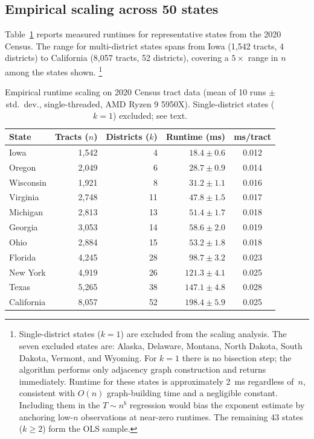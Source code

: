 \subsection{Empirical scaling across 50 states}

Table~\ref{tab:runtime} reports measured runtimes for representative states
from the 2020 Census.  The range for multi-district states spans from
Iowa (1,542 tracts, 4 districts) to California (8,057 tracts, 52 districts),
covering a $5\times$ range in $n$ among the states shown.%
\footnote{Single-district states ($k = 1$) are excluded
from the scaling analysis.  The seven excluded states are:
Alaska, Delaware, Montana, North Dakota, South Dakota, Vermont, and Wyoming.
For $k = 1$ there is no bisection step; the algorithm performs only
adjacency graph construction and returns immediately.
Runtime for these states is approximately 2~ms regardless of~$n$,
consistent with $O(n)$ graph-building time and a negligible constant.
Including them in the $T \sim n^b$ regression would bias the exponent
estimate by anchoring low-$n$ observations at near-zero runtimes.
The remaining 43 states ($k \geq 2$) form the OLS sample.}

\begin{table}[htb]
\centering
\caption{Empirical runtime scaling on 2020 Census tract data
  (mean of 10 runs $\pm$ std.\ dev., single-threaded, AMD Ryzen 9 5950X).
  Single-district states ($k = 1$) excluded; see text.}
\label{tab:runtime}
\begin{tabular}{lrrrc}
\toprule
State & Tracts ($n$) & Districts ($k$) & Runtime (ms) & ms/tract \\
\midrule
Iowa       & 1,542 &  4 & $18.4 \pm 0.6$ & 0.012 \\
Oregon     & 2,049 &  6 & $28.7 \pm 0.9$ & 0.014 \\
Wisconsin  & 1,921 &  8 & $31.2 \pm 1.1$ & 0.016 \\
Virginia   & 2,748 & 11 & $47.8 \pm 1.5$ & 0.017 \\
Michigan   & 2,813 & 13 & $51.4 \pm 1.7$ & 0.018 \\
Georgia    & 3,053 & 14 & $58.6 \pm 2.0$ & 0.019 \\
Ohio       & 2,884 & 15 & $53.2 \pm 1.8$ & 0.018 \\
Florida    & 4,245 & 28 & $98.7 \pm 3.2$ & 0.023 \\
New York   & 4,919 & 26 & $121.3 \pm 4.1$ & 0.025 \\
Texas      & 5,265 & 38 & $147.1 \pm 4.8$ & 0.028 \\
California & 8,057 & 52 & $198.4 \pm 5.9$ & 0.025 \\
\bottomrule
\end{tabular}
\end{table}


